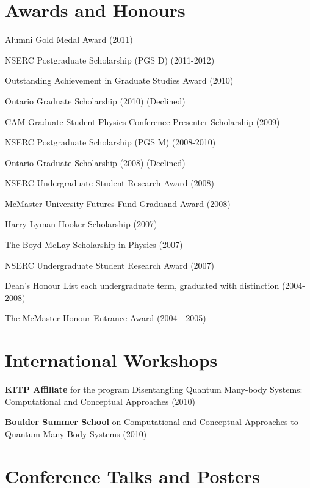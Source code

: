 \documentclass[letterpaper]{article}
\renewenvironment{itemize}{
  \begin{list}{}{
    \setlength{\leftmargin}{1.5em}
  }
}{
  \end{list}
}
\begin{document}
\section*{Awards and Honours}

\begin{itemize}
\item Alumni Gold Medal Award (2011)
\item NSERC Postgraduate Scholarship (PGS D) (2011-2012)
\item Outstanding Achievement in Graduate Studies Award (2010)
\item Ontario Graduate Scholarship (2010) (Declined)
\item CAM Graduate Student Physics Conference Presenter Scholarship (2009)
\item NSERC Postgraduate Scholarship (PGS M) (2008-2010)
\item Ontario Graduate Scholarship (2008) (Declined)
\item NSERC Undergraduate Student Research Award (2008)
\item McMaster University Futures Fund Graduand Award (2008)
\item Harry Lyman Hooker Scholarship (2007)
\item The Boyd McLay Scholarship in Physics (2007)
\item NSERC Undergraduate Student Research Award (2007)
\item Dean's Honour List each undergraduate term, graduated with distinction (2004-2008)
\item The McMaster Honour Entrance Award (2004 - 2005)
\end{itemize}

\section*{International Workshops}

\begin{itemize}

\item {\bf KITP Affiliate} for the program Disentangling Quantum Many-body Systems: Computational and Conceptual Approaches (2010)

\item {\bf Boulder Summer School} on Computational and Conceptual Approaches
to Quantum Many-Body Systems (2010)

\end{itemize}

\section*{Conference Talks and Posters}
\end{document}
